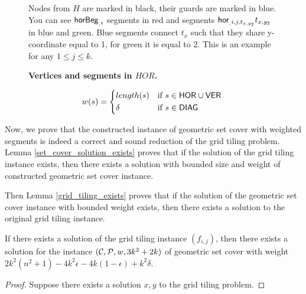 {{{{\begin{figure}
\begin{tikzpicture}[main/.style = {draw, circle}]
\end{tikzpicture} 
\caption{\textbf{Vertices and segments in $HOR$.}}
Nodes from $H$ are marked in black, their guards are marked in blue.
You can see $\horbeg_{i}$ segments in \textcolor{beg_color}{red}
and segments $\hor_{i}{j}{t_{x,y_2}}{t_{x,y_2}}$
in \textcolor{seg_color1}{blue} and \textcolor{seg_color2}{green}.
\textcolor{seg_color1}{Blue} segments connect $t_x$
such that they share y-coordinate equal to 1,
for \textcolor{seg_color2}{green} it is equal to 2.
This is an example for any $1 \le j \le k$.

\label{fig:segments_def}
\end{figure}

\begin{equation}
w(s) =
	\begin{cases*}
	  length(s) 			& if $s \in \allhor \cup \allver$ \\
	  \delta        & if $s \in \alldiag$
	\end{cases*}
\end{equation}

\newcommand{\solWeight}{2k^2(n^2+1) - 4k^2\epsilon -4k(1-\epsilon) +k^2\delta }

Now, we prove that the constructed instance of geometric set cover
with weighted segments is indeed a correct and sound reduction
of the grid tiling problem. Lemma \ref{set_cover_solution_exists}
proves that if the solution of the grid tiling instance exists,
then there exists a solution with bounded size and weight
of constructed geometric set cover instance.

Then Lemma \ref{grid_tiling_exists} proves that if the solution
of the geometric set cover instance with bounded weight exists,
then there exists a solution to the original grid tiling instance.

\begin{lemma}
\label{set_cover_solution_exists}
	If there exists a solution of the grid tiling instance $(f_{i,j})$,
	then there exists a solution for the instance $\instanceSetCover$
	of geometric set cover with weight $\solWeight$.
\end{lemma}

\begin{proof}
Suppose there exists a solution $x,y$ to the grid tiling problem.
	

\end{proof}}}}}
